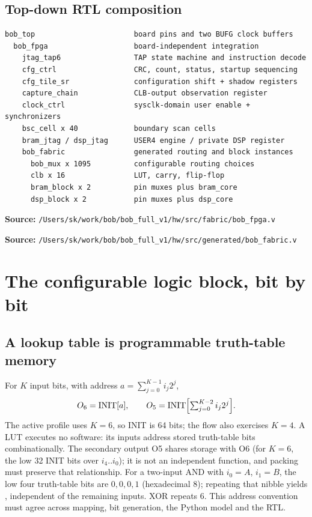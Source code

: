 \documentclass[11pt,a4paper]{article}
\newcommand{\code}[1]{\texttt{\detokenize{#1}}}
\newcommand{\src}[1]{\par\smallskip\noindent\textbf{Source: }\nolinkurl{/Users/sk/work/bob/bob_full_v1/#1}\par\smallskip}
\begin{document}
\subsection{Top-down RTL composition}
\begin{lstlisting}[caption={Main hardware hierarchy}]
bob_top                       board pins and two BUFG clock buffers
  bob_fpga                    board-independent integration
    jtag_tap6                 TAP state machine and instruction decode
    cfg_ctrl                  CRC, count, status, startup sequencing
    cfg_tile_sr               configuration shift + shadow registers
    capture_chain             CLB-output observation register
    clock_ctrl                sysclk-domain user enable + synchronizers
    bsc_cell x 40             boundary scan cells
    bram_jtag / dsp_jtag      USER4 engine / private DSP register
    bob_fabric                generated routing and block instances
      bob_mux x 1095          configurable routing choices
      clb x 16                LUT, carry, flip-flop
      bram_block x 2          pin muxes plus bram_core
      dsp_block x 2           pin muxes plus dsp_core
\end{lstlisting}
\src{hw/src/fabric/bob_fpga.v}
\src{hw/src/generated/bob_fabric.v}

\section{The configurable logic block, bit by bit}
\label{sec:clb}
\subsection{A lookup table is programmable truth-table memory}
For $K$ input bits, with address $a=\sum_{j=0}^{K-1}i_j2^j$,
\[ O_6=\mathrm{INIT}[a], \qquad
   O_5=\mathrm{INIT}\Bigl[\textstyle\sum_{j=0}^{K-2}i_j2^j\Bigr]. \]
The active profile uses $K=6$, so INIT is 64 bits; the flow also exercises $K=4$.
A LUT executes no software: its inputs address stored truth-table bits
combinationally. The secondary output O5 shares storage with O6 (for $K=6$, the
low 32 INIT bits over $i_4..i_0$); it is not an independent function, and
packing must preserve that relationship.
For a two-input AND with $i_0=A$, $i_1=B$, the low four truth-table bits are
$0,0,0,1$ (hexadecimal 8); repeating that nibble yields
\code{64'h8888888888888888}, independent of the remaining inputs. XOR repeats 6.
This address convention must agree across mapping, bit generation, the Python
model and the RTL.
\end{document}

